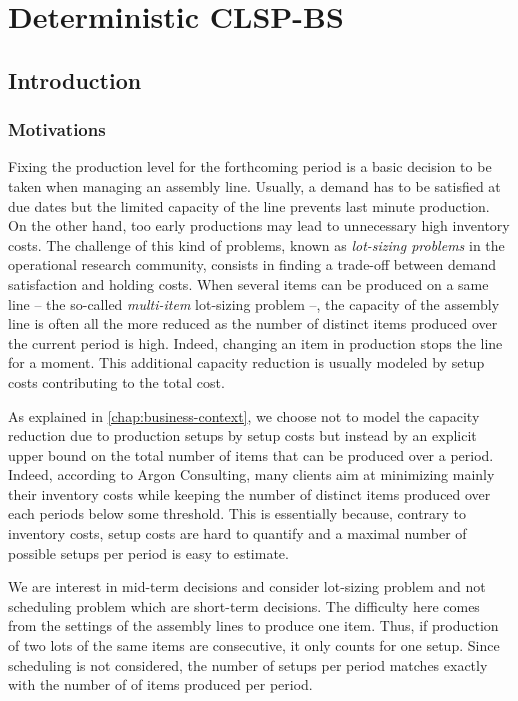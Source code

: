 \chapter{Deterministic CLSP-BS}
\label{chap:PDP:deterministic}


\section{Introduction}


\subsection{Motivations}
\label{sec:PDP:deterministic:introduction:motivations}

Fixing the production level for the forthcoming period is a basic decision to be taken when managing an assembly line.
Usually, a demand has to be satisfied at due dates but the limited capacity of the line prevents last minute production.
On the other hand, too early productions may lead to unnecessary high inventory costs.
The challenge of this kind of problems, known as {\em lot-sizing problems} in the operational research community, consists in finding a trade-off between demand satisfaction and holding costs.
When several items can be produced on a same line -- the so-called {\em multi-item} lot-sizing problem --, the capacity of the assembly line is often all the more reduced as the number of distinct items produced over the current period is high.
Indeed, changing an item in production stops the line for a moment.
This additional capacity reduction is usually modeled by setup costs contributing to the total cost.


As explained in \cref{chap:business-context}, we choose not to model the capacity reduction due to production setups by setup costs but instead by an explicit upper bound on the total number of items that can be produced over a period.
Indeed, according to Argon Consulting, many clients aim at minimizing mainly their inventory costs while keeping the number of distinct items produced over each periods below some threshold.
This is essentially because, contrary to inventory costs, setup costs are hard to quantify and a maximal number of possible setups per period is easy to estimate.


We are interest in mid-term decisions and consider lot-sizing problem and not scheduling problem which are short-term decisions.
The difficulty here comes from the settings of the assembly lines to produce one item.
Thus, if production of two lots of the same items are consecutive, it only counts for one setup.
Since scheduling is not considered, the number of setups per period matches exactly with the number of of items produced per period.



